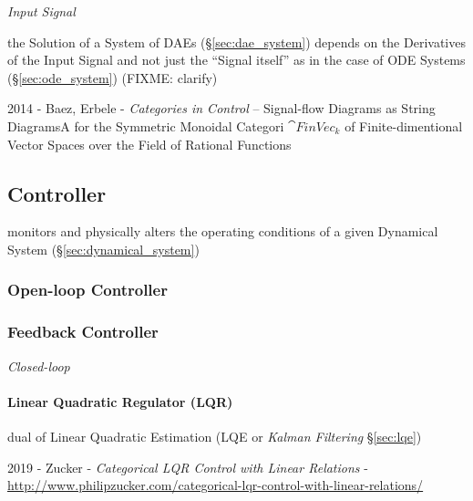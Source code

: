 \emph{Input Signal}

\fist the Solution of a System of DAEs (\S\ref{sec:dae_system}) depends on
the Derivatives of the Input Signal and not just the ``Signal itself'' as in
the case of ODE Systems (\S\ref{sec:ode_system})
(FIXME: clarify)

2014 - Baez, Erbele - \emph{Categories in Control} -- Signal-flow Diagrams as
String DiagramsA for the Symmetric Monoidal Categori $\cat{FinVec}_k$ of
Finite-dimentional Vector Spaces over the Field of Rational Functions



\subsection{Controller}\label{sec:controller}


monitors and physically alters the operating conditions of a given
Dynamical System (\S\ref{sec:dynamical_system})



\subsubsection{Open-loop Controller}\label{sec:open_loop}

\subsubsection{Feedback Controller}\label{sec:feedback_controller}

\emph{Closed-loop}



\paragraph{Linear Quadratic Regulator (LQR)}\label{sec:lqr}\hfill

dual of Linear Quadratic Estimation (LQE or \emph{Kalman Filtering}
\S\ref{sec:lqe})

2019 - Zucker - \emph{Categorical LQR Control with Linear Relations} -
  \url{http://www.philipzucker.com/categorical-lqr-control-with-linear-relations/}



